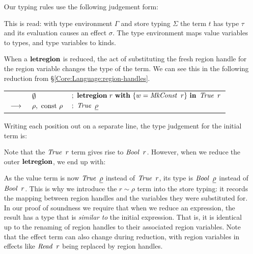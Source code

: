 Our typing rules use the following judgement form:
\begin{center}
\end{center}

This is read: with type environment $\Gamma$ and store typing $\Sigma$ the term $t$ has type $\tau$ and its evaluation causes an effect $\sigma$. The type environment maps value variables to types, and type variables to kinds. 

When a $\textrm{\textbf{letregion}}$ is reduced, the act of substituting the fresh region handle for the region variable changes the type of the term. We can see this in the following reduction from \S\ref{Core:Language:region-handles}. 

\medskip
\qq
\begin{tabular}{lll}
		& $\emptyset$			
		& $ ; \ \kletregion \ r \ \kwith \ \{ w = \iMkConst \ r \} \ 
				\kin \ \iTrue \ r$ 
		\\
	$\ \textbf{$\longrightarrow$} \ $	& $\rho, \ \textrm{const} \ \rho$	
		& $ ; \ \iTrue \ \un{\rho}$
\end{tabular}
\medskip

Writing each position out on a separate line, the type judgement for the initial term is:


Note that the $\iTrue \ r$ term gives rise to $\iBool \ r$. However, when we reduce the outer $\textrm{\textbf{letregion}}$, we end up with:


As the value term is now $\iTrue \ \un{\rho}$ instead of $\iTrue \ r$, its type is $\iBool \ \un{\rho}$ instead of $\iBool \ r$. This is why we introduce the $r \sim \rho$ term into the store typing: it records the mapping between region handles and the variables they were substituted for. In our proof of soundness we require that when we reduce an expression, the result has a type that is \emph{similar to} the initial expression. That is, it is identical up to the renaming of region handles to their associated region variables. Note that the effect term can also change during reduction, with region variables in effects like $\operatorname{\mathit{Read}} \ r$ being replaced by region handles.



